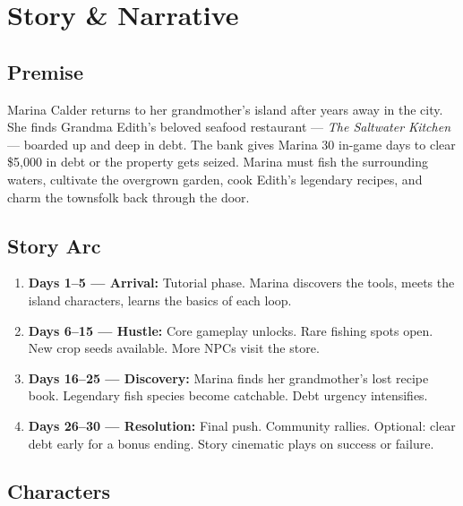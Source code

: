 \documentclass[11pt, letterpaper]{article}
\begin{document}
\section{Story \& Narrative}

\subsection{Premise}

Marina Calder returns to her grandmother's island after years away in the city. She finds Grandma Edith's beloved seafood restaurant --- \textit{The Saltwater Kitchen} --- boarded up and deep in debt. The bank gives Marina 30 in-game days to clear \$5,000 in debt or the property gets seized. Marina must fish the surrounding waters, cultivate the overgrown garden, cook Edith's legendary recipes, and charm the townsfolk back through the door.

\subsection{Story Arc}

\begin{enumerate}
  \item \textbf{Days 1--5 --- Arrival:} Tutorial phase. Marina discovers the tools, meets the island characters, learns the basics of each loop.
  \item \textbf{Days 6--15 --- Hustle:} Core gameplay unlocks. Rare fishing spots open. New crop seeds available. More NPCs visit the store.
  \item \textbf{Days 16--25 --- Discovery:} Marina finds her grandmother's lost recipe book. Legendary fish species become catchable. Debt urgency intensifies.
  \item \textbf{Days 26--30 --- Resolution:} Final push. Community rallies. Optional: clear debt early for a bonus ending. Story cinematic plays on success or failure.
\end{enumerate}

\subsection{Characters}
\end{document}
